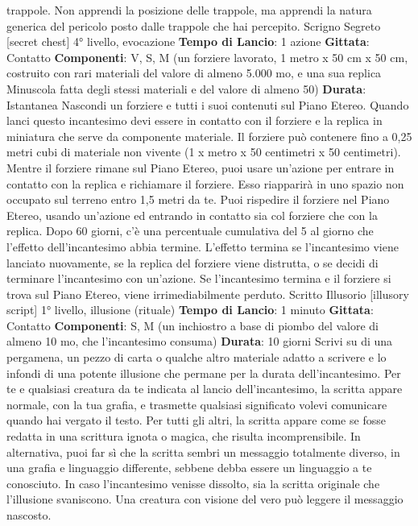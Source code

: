\begin{multicols}{2}
trappole. Non apprendi la posizione delle trappole, ma
apprendi la natura generica del pericolo posto dalle
trappole che hai percepito.
Scrigno Segreto
[secret chest]
4° livello, evocazione
\textbf{Tempo di Lancio}: 1 azione
\textbf{Gittata}: Contatto
\textbf{Componenti}: V, S, M (un forziere lavorato, 1 metro x
50 cm x 50 cm, costruito con rari materiali del valore di
almeno 5.000 mo, e una sua replica Minuscola fatta
degli stessi materiali e del valore di almeno 50)
\textbf{Durata}: Istantanea
Nascondi un forziere e tutti i suoi contenuti sul Piano
Etereo. Quando lanci questo incantesimo devi essere in
contatto con il forziere e la replica in miniatura che
serve da componente materiale. Il forziere può
contenere fino a 0,25 metri cubi di materiale non
vivente (1 x metro x 50 centimetri x 50 centimetri).
Mentre il forziere rimane sul Piano Etereo, puoi usare
un’azione per entrare in contatto con la replica e
richiamare il forziere. Esso riapparirà in uno spazio non
occupato sul terreno entro 1,5 metri da te. Puoi
rispedire il forziere nel Piano Etereo, usando un’azione
ed entrando in contatto sia col forziere che con la
replica.
Dopo 60 giorni, c’è una percentuale cumulativa del 5%
al giorno che l’effetto dell’incantesimo abbia termine.
L’effetto termina se l’incantesimo viene lanciato
nuovamente, se la replica del forziere viene distrutta, o
se decidi di terminare l’incantesimo con un’azione. Se
l’incantesimo termina e il forziere si trova sul Piano
Etereo, viene irrimediabilmente perduto.
Scritto Illusorio
[illusory script]
1° livello, illusione (rituale)
\textbf{Tempo di Lancio}: 1 minuto
\textbf{Gittata}: Contatto
\textbf{Componenti}: S, M (un inchiostro a base di piombo del
valore di almeno 10 mo, che l’incantesimo consuma)
\textbf{Durata}: 10 giorni
Scrivi su di una pergamena, un pezzo di carta o
qualche altro materiale adatto a scrivere e lo infondi di
una potente illusione che permane per la durata
dell’incantesimo.
Per te e qualsiasi creatura da te indicata al lancio
dell’incantesimo, la scritta appare normale, con la tua
grafia, e trasmette qualsiasi significato volevi
comunicare quando hai vergato il testo. Per tutti gli altri,
la scritta appare come se fosse redatta in una scrittura
ignota o magica, che risulta incomprensibile. In
alternativa, puoi far sì che la scritta sembri un
messaggio totalmente diverso, in una grafia e
linguaggio differente, sebbene debba essere un
linguaggio a te conosciuto.
In caso l’incantesimo venisse dissolto, sia la scritta
originale che l’illusione svaniscono.
Una creatura con visione del vero può leggere il
messaggio nascosto.

\end{multicols}
